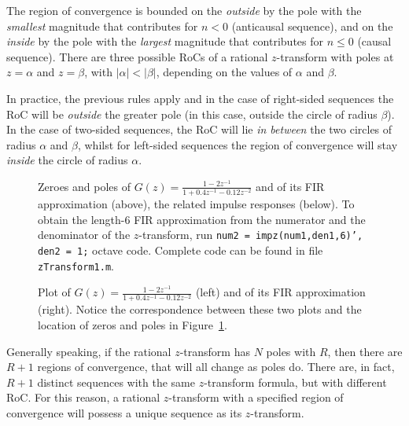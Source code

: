 \documentclass[\documentfontsize, twocolumn]{\classname}
\begin{document}
The region of convergence is bounded on the \emph{outside} by the pole with the \emph{smallest} magnitude that contributes for $n < 0$ (anticausal sequence), and on the \emph{inside} by the pole with the \emph{largest} magnitude that contributes for $n \leq 0$ (causal sequence). There are three possible RoCs of a rational $z$-transform with poles at $z = \alpha$ and $z = \beta$, with $|\alpha| < |\beta|$, depending on the values of $\alpha$ and $\beta$.

In practice, the previous rules apply and in the case of right-sided sequences the RoC will be \emph{outside} the greater pole (in this case, outside the circle of radius $\beta$). In the case of two-sided sequences, the RoC will lie \emph{in between} the two circles of radius $\alpha$ and $\beta$, whilst for left-sided sequences the region of convergence will stay \emph{inside} the circle of radius $\alpha$.

\begin{figure*}[ht]
\begin{center}
\scalebox{0.4}{

    }\caption{Zeroes and poles of $G(z) = \frac{1 - 2z^{-1}}{1 + 0.4z^{-1} - 0.12z^{-2}}$ and of its FIR approximation (above), the related impulse responses (below). To obtain the length-$6$ FIR approximation from the numerator and the denominator of the $z$-transform, run \texttt{num2 = impz(num1,den1,6)', den2 = 1;} octave code. Complete code can be found in file \texttt{zTransform1.m}.}\label{oct:zTransform1}
\end{center}
\end{figure*}

\begin{figure*}[ht]
\begin{center}
\scalebox{0.4}{

    }\caption{Plot of $G(z) = \frac{1 - 2z^{-1}}{1 + 0.4z^{-1} - 0.12z^{-2}}$ (left) and of its FIR approximation (right). Notice the correspondence between these two plots and the location of zeros and poles in Figure~\ref{oct:zTransform1}.}\label{oct:zTransform2}
\end{center}
\end{figure*}

Generally speaking, if the rational $z$-transform has $N$ poles with $R$, then there are $R+1$ regions of convergence, that will all change as poles do. There are, in fact, $R+1$ distinct sequences with the same $z$-transform formula, but with different RoC. For this reason, a rational $z$-transform with a specified region of convergence will possess a unique sequence as its $z$-transform.
\end{document}
